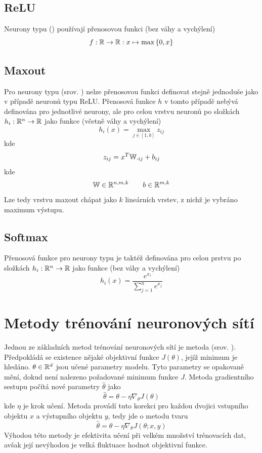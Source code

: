 \subsection{ReLU}
Neurony typu  () používají přenosovou funkci (bez váhy a vychýlení)
\[ f : \mathbb R \to \mathbb R : x \mapsto \max \left\{ 0, x \right\} \]

\subsection{Maxout}
Pro neurony typu  (srov. \cite{goodfellow_maxout_2013}) nelze přenosovou funkci definovat stejně jednoduše jako v případě neuronů typu ReLU. Přenosová funkce \( h \) v tomto případě nebývá definována pro jednotlivé neurony, ale pro celou vrstvu neuronů po složkách \( h_i : \mathbb R^n \to \mathbb R \) jako funkce (včetně váhy a vychýlení)
\[ h_i \left( x \right) = \max_{j \in \left[ 1, k \right]} z_{ij} \]
kde
\[ z_{ij} = x^T \mathbb W_{\cdot ij} + b_{ij} \]
kde
\[ \mathbb W \in \mathbb R^{n, m, k} \qquad b \in \mathbb R^{m, k} \]
Lze tedy vrstvu maxout chápat jako \( k \) lineárních vrstev, z nichž je vybráno maximum výstupu.

\subsection{Softmax}
Přenosová funkce pro neurony typu  je taktéž definována pro celou prstvu po složkách \( h_i : \mathbb R^n \to \mathbb R \) jako funkce (bez váhy a vychýlení)
\[ h_i \left( x \right) = \frac{e^{x_i}}{\sum_{j = 1}^n e^{x_j}} \]

\section{Metody trénování neuronových sítí}
Jednou ze základních metod trénování neuronových sítí je metoda  (srov. \cite{cauchy_methode_1847}). Předpokládá se existence nějaké objektivní funkce \( J \left( \theta \right) \), jejíž minimum je hledáno. \( \theta \in \mathbb R^d \) jsou učené parametry modelu. Tyto parametry se opakovaně mění, dokud není nalezeno požadované minimum funkce \( J \). Metoda gradientního sestupu počítá nové parametry \( \hat \theta \) jako
\[ \hat \theta = \theta - \eta \nabla_{\theta} J \left( \theta \right) \]
kde \( \eta \) je krok učení. Metoda  provádí tuto korekci pro každou dvojici vstupního objektu \( x \) a výstupního objektu \( y \), tedy jde o metodu tvaru
\[ \hat \theta = \theta - \eta \nabla_{\theta} J \left( \theta; x, y \right) \]
Výhodou této metody je efektivita učení při velkém množství trénovacích dat, avšak její nevýhodou je velká fluktuace hodnot objektivní funkce.

